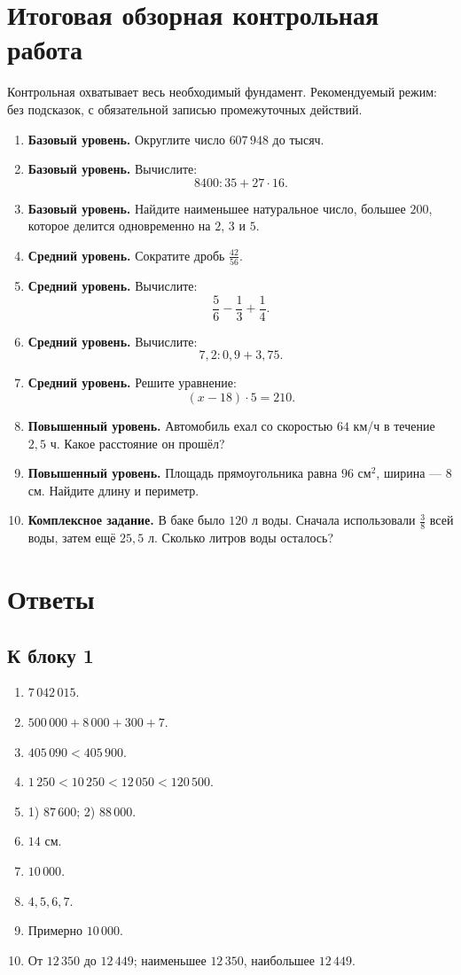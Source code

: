\documentclass[12pt,a4paper]{article}
\begin{document}
\section{Итоговая обзорная контрольная работа}

Контрольная охватывает весь необходимый фундамент. Рекомендуемый режим: без подсказок, с обязательной записью промежуточных действий.

\begin{enumerate}
  \item \textbf{Базовый уровень.} Округлите число $607\,948$ до тысяч.
  \item \textbf{Базовый уровень.} Вычислите:
  \[
  8400:35+27\cdot16.
  \]
  \item \textbf{Базовый уровень.} Найдите наименьшее натуральное число, большее $200$, которое делится одновременно на $2$, $3$ и $5$.
  \item \textbf{Средний уровень.} Сократите дробь $\frac{42}{56}$.
  \item \textbf{Средний уровень.} Вычислите:
  \[
  \frac56-\frac13+\frac14.
  \]
  \item \textbf{Средний уровень.} Вычислите:
  \[
  7{,}2:0{,}9+3{,}75.
  \]
  \item \textbf{Средний уровень.} Решите уравнение:
  \[
  (x-18)\cdot5=210.
  \]
  \item \textbf{Повышенный уровень.} Автомобиль ехал со скоростью $64$ км/ч в течение $2{,}5$ ч. Какое расстояние он прошёл?
  \item \textbf{Повышенный уровень.} Площадь прямоугольника равна $96$ см$^2$, ширина --- $8$ см. Найдите длину и периметр.
  \item \textbf{Комплексное задание.} В баке было $120$ л воды. Сначала использовали $\frac38$ всей воды, затем ещё $25{,}5$ л. Сколько литров воды осталось?
\end{enumerate}

\newpage

\section{Ответы}

\subsection*{К блоку 1}
\begin{enumerate}
  \item $7\,042\,015$.
  \item $500\,000+8\,000+300+7$.
  \item $405\,090<405\,900$.
  \item $1\,250<10\,250<12\,050<120\,500$.
  \item 1) $87\,600$; 2) $88\,000$.
  \item $14$ см.
  \item $10\,000$.
  \item $4,5,6,7$.
  \item Примерно $10\,000$.
  \item От $12\,350$ до $12\,449$; наименьшее $12\,350$, наибольшее $12\,449$.
\end{enumerate}
\end{document}
